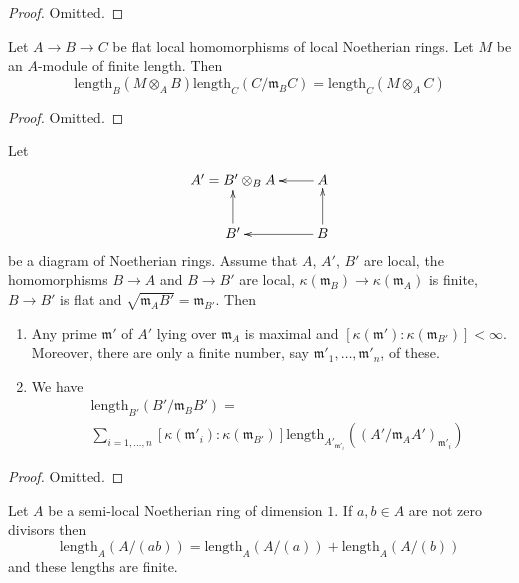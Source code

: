 \begin{proof}
Omitted.
\end{proof}

\begin{lemma}
\label{lemma-pullback-transitive}
Let $A \to B \to C$ be flat local homomorphisms of local Noetherian rings.
Let $M$ be an $A$-module of finite length.
Then
$$
\text{length}_B(M \otimes_A B) \text{length}_C(C/\mathfrak m_B C)
=
\text{length}_C(M \otimes_A C)
$$
\end{lemma}

\begin{proof}
Omitted.
\end{proof}

\begin{lemma}
\label{lemma-flat-pullback-pushdown-module}
Let
$$
\xymatrix{
A' = B' \otimes_B A & A \ar[l] \\
B' \ar[u] & B \ar[l] \ar[u]
}
$$
be a diagram of Noetherian rings. Assume that $A$, $A'$, $B'$ are local,
the homomorphisms $B \to A$ and $B \to B'$ are local,
$\kappa(\mathfrak m_B) \to \kappa(\mathfrak m_A)$ is finite,
$B \to B'$ is flat and $\sqrt{\mathfrak m_A B'} = \mathfrak m_{B'}$.
Then
\begin{enumerate}
\item Any prime $\mathfrak m'$ of $A'$ lying over $\mathfrak m_A$
is maximal and $[\kappa(\mathfrak m') : \kappa(\mathfrak m_{B'})] < \infty$.
Moreover, there are only a finite number, say
$\mathfrak m'_1, \ldots, \mathfrak m'_n$, of these.
\item We have
\begin{align*}
[\kappa(\mathfrak m_A) : \kappa(\mathfrak m_B)]
&
\text{length}_{B'}(B'/\mathfrak m_BB')
= \\
& \sum\nolimits_{i = 1, \ldots, n}
[\kappa(\mathfrak m'_i) : \kappa(\mathfrak m_{B'})]
\text{length}_{A'_{\mathfrak m'_i}}((A'/\mathfrak m_AA')_{\mathfrak m'_i})
\end{align*}
\end{enumerate}
\end{lemma}

\begin{proof}
Omitted.
\end{proof}

\begin{lemma}
\label{lemma-length-additive}
Let $A$ be a semi-local Noetherian ring of dimension $1$.
If $a, b \in A$ are not zero divisors then
$$
\text{length}_A(A/(ab)) =
\text{length}_A(A/(a)) +
\text{length}_A(A/(b))
$$
and these lengths are finite.
\end{lemma}


